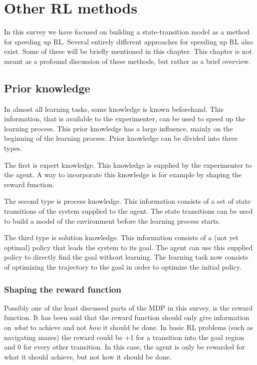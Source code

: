 \documentclass[a4paper,11pt]{mscLiterature}
\begin{document}
\chapter{Other RL methods} \label{chap:otherRLMethods}
In this survey we have focused on building a state-transition model as a method for speeding up RL. Several entirely different approaches for speeding up RL also exist. Some of these will be briefly mentioned in this chapter. This chapter is not meant as a profound discussion of these methods, but rather as a brief overview.
	
\section{Prior knowledge}
In almost all learning tasks, some knowledge is known beforehand. This information, that is available to the experimenter, can be used to speed up the learning process. This prior knowledge has a large influence, mainly on the beginning of the learning process. Prior knowledge can be divided into three types. 

The first is expert knowledge. This knowledge is supplied by the experimenter to the agent. A way to incorporate this knowledge is for example by shaping the reward function.

The second type is process knowledge. This information consists of a set of state transitions of the system supplied to the agent. The state transitions can be used to build a model of the environment before the learning process starts.

The third type is solution knowledge. This information consists of a (not yet optimal) policy that leads the system to its goal. The agent can use this supplied policy to directly find the goal without learning. The learning task now consists of optimizing the trajectory to the goal in order to optimize the initial policy.
	
\subsection{Shaping the reward function}
	Possibly one of the least discussed parts of the MDP in this survey, is the reward function. It has been said \cite{SuttonBarto:98} that the reward function should only give information on \emph{what} to achieve and not \emph{how} it should be done. In basic RL problems (such as navigating mazes) the reward could be +1 for a transition into the goal region and 0 for every other transition. In this case, the agent is only be rewarded for what it should achieve, but not how it should be done.
	
\end{document}
